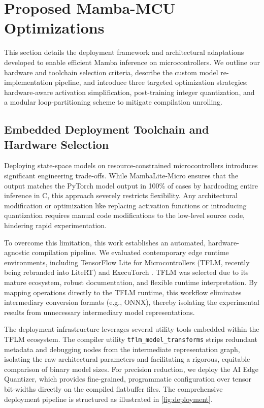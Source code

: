 \section{Proposed Mamba-MCU Optimizations}
\label{sec:methodology}

This section details the deployment framework and architectural adaptations developed to enable efficient Mamba inference on microcontrollers. We outline our hardware and toolchain selection criteria, describe the custom model re-implementation pipeline, and introduce three targeted optimization strategies: hardware-aware activation simplification, post-training integer quantization, and a modular loop-partitioning scheme to mitigate compilation unrolling.

\subsection{Embedded Deployment Toolchain and Hardware Selection}
\label{sec:embedded_deployment}

Deploying state-space models on resource-constrained microcontrollers introduces significant engineering trade-offs. While MambaLite-Micro \cite{xuMambaLiteMicroMemoryOptimizedMamba2025} ensures that the output matches the PyTorch model output in 100\% of cases by hardcoding entire inference in C, this approach severely restricts flexibility. Any architectural modification or optimization like replacing activation functions or introducing quantization requires manual code modifications to the low-level source code, hindering rapid experimentation.

To overcome this limitation, this work establishes an automated, hardware-agnostic compilation pipeline. We evaluated contemporary edge runtime environments, including TensorFlow Lite for Microcontrollers (TFLM, recently being rebranded into LiteRT) \cite{davidTensorFlowLiteMicro2021} and ExecuTorch \cite{executorch2026}. TFLM was selected due to its mature ecosystem, robust documentation, and flexible runtime interpretation. By mapping operations directly to the TFLM runtime, this workflow eliminates intermediary conversion formats (e.g., ONNX), thereby isolating the experimental results from unnecessary intermediary model representations.

The deployment infrastructure leverages several utility tools embedded within the TFLM ecosystem. The compiler utility \texttt{tflm\_model\_transforms} strips redundant metadata and debugging nodes from the intermediate representation graph, isolating the raw architectural parameters and facilitating a rigorous, equitable comparison of binary model sizes. For precision reduction, we deploy the AI Edge Quantizer, which provides fine-grained, programmatic configuration over tensor bit-widths directly on the compiled flatbuffer files. The comprehensive deployment pipeline is structured as illustrated in \autoref{fig:deployment}.

